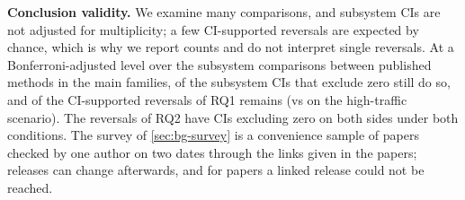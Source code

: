 \textbf{Conclusion validity.}
We examine many comparisons, and subsystem CIs are not adjusted for multiplicity; a few CI-supported reversals are expected by chance, which is why we report counts and do not interpret single reversals.
At a Bonferroni-adjusted level over the \NBonfComp subsystem comparisons between published methods in the main families, \NBonfCIAdjExcl of the \NBonfCIExcl subsystem CIs that exclude zero still do so, and \NBonfRevCI of the \NMainPubRevCI CI-supported reversals of RQ1 remains (\cfa vs \rcd on the high-traffic scenario).
The reversals of RQ2 have CIs excluding zero on both sides under both conditions.
The survey of \cref{sec:bg-survey} is a convenience sample of \SurveyN papers checked by one author on two dates through the links given in the papers; releases can change afterwards, and for \SurveyRelUndet papers a linked release could not be reached.
